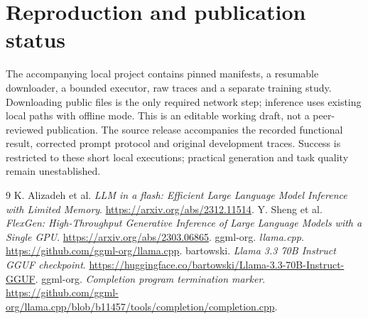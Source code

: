 \documentclass[11pt]{article}
\begin{document}
\section{Reproduction and publication status}
The accompanying local project contains pinned manifests, a resumable downloader, a bounded executor, raw traces and a separate training study. Downloading public files is the only required network step; inference uses existing local paths with offline mode. This is an editable working draft, not a peer-reviewed publication. The source release accompanies the recorded functional result, corrected prompt protocol and original development traces. Success is restricted to these short local executions; practical generation and task quality remain unestablished.

\begin{thebibliography}{9}
 K. Alizadeh et al. \emph{LLM in a flash: Efficient Large Language Model Inference with Limited Memory}. \url{https://arxiv.org/abs/2312.11514}.
 Y. Sheng et al. \emph{FlexGen: High-Throughput Generative Inference of Large Language Models with a Single GPU}. \url{https://arxiv.org/abs/2303.06865}.
 ggml-org. \emph{llama.cpp}. \url{https://github.com/ggml-org/llama.cpp}.
 bartowski. \emph{Llama 3.3 70B Instruct GGUF checkpoint}. \url{https://huggingface.co/bartowski/Llama-3.3-70B-Instruct-GGUF}.
 ggml-org. \emph{Completion program termination marker}. \url{https://github.com/ggml-org/llama.cpp/blob/b11457/tools/completion/completion.cpp}.
\end{thebibliography}
\end{document}
